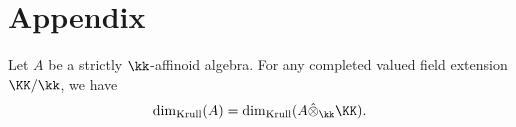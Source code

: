 \section{Appendix}

    \begin{proposition}\label{prop:krull_dimension_of_affinoid_domain_under_ground_field_changing}
        Let \(A\) be a strictly \(\kk\)-affinoid algebra.
        For any completed valued field extension \(\KK/\kk\), we have 
        \[ \dim_{\text{Krull}}(A) = \dim_{\text{Krull}}(A \hat{\otimes}_\kk \KK). \]
    \end{proposition}